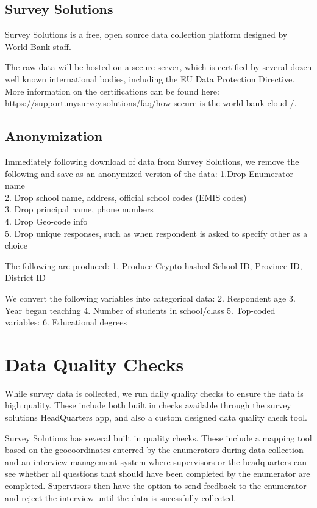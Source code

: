 \documentclass[]{article}
\begin{document}
\hypertarget{survey-solutions}{%
\subsection{Survey Solutions}\label{survey-solutions}}

Survey Solutions is a free, open source data collection platform
designed by World Bank staff.

The raw data will be hosted on a secure server, which is certified by
several dozen well known international bodies, including the EU Data
Protection Directive. More information on the certifications can be
found here:
\url{https://support.mysurvey.solutions/faq/how-secure-is-the-world-bank-cloud-/}.

\hypertarget{anonymization}{%
\subsection{Anonymization}\label{anonymization}}

Immediately following download of data from Survey Solutions, we remove
the following and save as an anonymized version of the data: 1.Drop
Enumerator name\\
2. Drop school name, address, official school codes (EMIS codes)\\
3. Drop principal name, phone numbers\\
4. Drop Geo-code info\\
5. Drop unique responses, such as when respondent is asked to specify
other as a choice

The following are produced: 1. Produce Crypto-hashed School ID, Province
ID, District ID

We convert the following variables into categorical data: 2. Respondent
age 3. Year began teaching 4. Number of students in school/class 5.
Top-coded variables: 6. Educational degrees

\hypertarget{data-quality-checks}{%
\section{Data Quality Checks}\label{data-quality-checks}}

While survey data is collected, we run daily quality checks to ensure
the data is high quality. These include both built in checks available
through the survey solutions HeadQuarters app, and also a custom
designed data quality check tool.

Survey Solutions has several built in quality checks. These include a
mapping tool based on the geocoordinates enterred by the enumerators
during data collection and an interview management system where
supervisors or the headquarters can see whether all questions that
should have been completed by the enumerator are completed. Supervisors
then have the option to send feedback to the enumerator and reject the
interview until the data is sucessfully collected.
\end{document}
